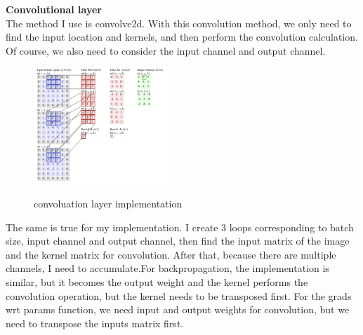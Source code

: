 \documentclass{article}
\begin{document}
\textbf{Convolutional layer}\\
The method I use is convolve2d. With this convolution method, we only need to find the input location and kernels, and then perform the convolution calculation. Of course, we also need to consider the input channel and output channel.
\begin{figure}[H] %
	\centering %
	\includegraphics[width=0.45\textwidth]{./pic/part1/cnlayerImp.png} %
	\caption{convoluation layer implementation} %
	\label{Fig.main2} %
	\cite{cs231n}
\end{figure}
The same is true for my implementation. I create 3 loops corresponding to batch  size, input channel and output channel, then find the input matrix of the image and the kernel matrix for convolution. After that, because there are multiple channels, I need to accumulate.For backpropagation, the implementation is similar, but it becomes the output weight and the kernel performs the convolution operation, but the kernel needs to be transposed first. For the grads wrt params function, we need input and output weights for convolution, but we need to transpose the inputs matrix first.\\
\end{document}
